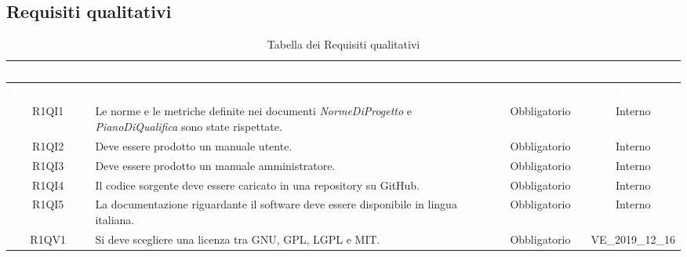\subsection{Requisiti qualitativi}
{
\renewcommand{\arraystretch}{1.5}
\centering
\begin{longtable}{ c C{6.5cm} c c}
\caption{Tabella dei Requisiti qualitativi}\\
\textcolor{white}{\textbf{Identificativo}} & \textcolor{white}{\textbf{Descrizione}} & \textcolor{white}{\textbf{Classificazione}} & \textcolor{white}{\textbf{Fonti}}\\	
\endfirsthead
{}
\textcolor{white}{\textbf{Identificativo}} & \textcolor{white}{\textbf{Descrizione}} & \textcolor{white}{\textbf{Classificazione}} & \textcolor{white}{\textbf{Fonti}}\\
\endhead

R1QI1 & Le norme e le metriche definite nei documenti \textit{NormeDiProgetto} e \textit{PianoDiQualifica} sono state rispettate. & Obbligatorio & Interno\\

R1QI2 & Deve essere prodotto un manuale utente. & Obbligatorio & Interno\\

R1QI3 & Deve essere prodotto un manuale amministratore. & Obbligatorio & Interno\\

R1QI4 & Il codice sorgente deve essere caricato in una repository su GitHub. & Obbligatorio & Interno\\

R1QI5 & La documentazione riguardante il software deve essere disponibile in lingua italiana. & Obbligatorio & Interno\\

R1QV1 & Si deve scegliere una licenza tra GNU, GPL, LGPL e MIT. & Obbligatorio & VE\_2019\_12\_16 \\

\end{longtable}
}